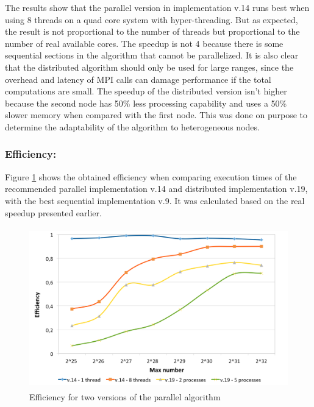 \documentclass[runningheads,a4paper]{llncs}
\begin{document}
The results show that the parallel version in implementation v.14 runs best when using 8 threads on a quad core system with hyper-threading. But as expected, the result is not proportional to the number of threads but proportional to the number of real available cores. The speedup is not 4 because there is some sequential sections in the algorithm that cannot be parallelized. It is also clear that the distributed algorithm should only be used for large ranges, since the overhead and latency of MPI calls can damage performance if the total computations are small. The speedup of the distributed version isn't higher because the second node has 50\% less processing capability and uses a 50\% slower memory when compared with the first node. This was done on purpose to determine the adaptability of the algorithm to heterogeneous nodes.


\subsubsection{Efficiency:}
\label{Efficiency:}

Figure \ref{fig:efficiency} shows the obtained efficiency when comparing execution times of the recommended parallel implementation v.14 and distributed implementation v.19, with the best sequential implementation v.9. It was calculated based on the real speedup presented earlier.

\begin{figure}[h]
        \centering
        \includegraphics[height=7.0cm]{images/efficiency}
        \caption{Efficiency for two versions of the parallel algorithm}
        \label{fig:efficiency}
\end{figure}
\end{document}
